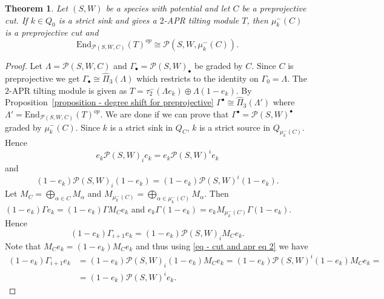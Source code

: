 \documentclass[a4paper, reqno]{amsart}
\newtheorem{mythm}{Theorem}[section]
\theoremstyle{definition}
\begin{document}
\begin{mythm}\label{theorem - cut and apr correspondence}
	Let $(S, W)$ be a species with potential and let $C$ be a preprojective cut. If $k\in Q_0$ is a strict sink and gives a $2$-APR tilting module $T$, then $\mu_k^-(C)$ is a preprojective cut and
	\begin{equation}\label{eq - cut and apr equation}
		\mathrm{End}_{\mathcal{P}(S, W, C)}(T)^{op} \cong \mathcal{P}(S, W, \mu_k^-(C)).
	\end{equation}
\end{mythm}

\begin{proof}
	Let $\Lambda = \mathcal{P}(S, W, C)$ and $\Gamma_\bullet = \mathcal{P}(S, W)_\bullet$ be graded by $C$. Since $C$ is preprojective we get $\Gamma_\bullet \cong \widehat{\Pi}_3(\Lambda)$ which restricts to the identity on $\Gamma_0 = \Lambda$. The $2$-APR tilting module is given as $T = \tau_2^-(\Lambda e_k)\oplus \Lambda(1- e_k)$. By Proposition~\ref{proposition - degree shift for preprojective} $\Gamma^\bullet \cong \widehat{\Pi}_3(\Lambda')$ where $\Lambda' = \mathrm{End}_{\mathcal{P}(S, W, C)}(T)^{op}$. We are done if we can prove that $\Gamma^\bullet = \mathcal{P}(S, W)^\bullet$ graded by $\mu_k^-(C)$. Since $k$ is a strict sink in $Q_C$, $k$ is a strict source in $Q_{\mu_k^-(C)}$. Hence
	\begin{equation}\label{eq - cut and apr eq 1}
		e_k\mathcal{P}(S, W)_ie_k = e_k\mathcal{P}(S, W)^ie_k
	\end{equation}
	and
	\begin{equation}\label{eq - cut and apr eq 2}
		(1-e_k)\mathcal{P}(S, W)_i(1- e_k) = (1-e_k)\mathcal{P}(S, W)^i(1- e_k).
	\end{equation}
	Let $M_C = \bigoplus_{\alpha\in C}M_\alpha$ and $M_{\mu_k^-(C)} = \bigoplus_{\alpha\in \mu_k^-(C)}M_\alpha$. Then $(1- e_k)\Gamma e_k = (1-e_k)\Gamma M_C e_k$ and $e_k \Gamma(1- e_k) = e_k M_{\mu_k^-(C)}\Gamma(1-e_k)$. Hence
	\begin{equation*}
		(1-e_k)\Gamma_{i+1}e_k = (1-e_k)\mathcal{P}(S, W)_iM_C e_k.
	\end{equation*}
	Note that $M_C e_k = (1-e_k)M_C e_k$ and thus using \eqref{eq - cut and apr eq 2} we have
	\begin{equation}\label{eq - cut and apr eq 3}
		\begin{aligned}
			(1-e_k)\Gamma_{i+1}e_k &= (1-e_k)\mathcal{P}(S, W)_i(1-e_k)M_C e_k = (1-e_k)\mathcal{P}(S, W)^i(1- e_k)M_C e_k = \\
			&= (1-e_k)\mathcal{P}(S, W)^i e_k.

\end{aligned}
\end{equation}
\end{proof}
\end{document}
